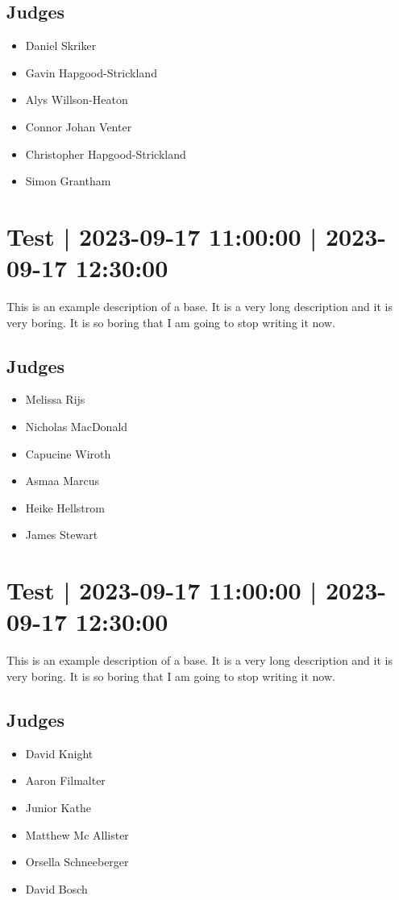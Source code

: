 \documentclass[10pt]{article}
\begin{document}
	\subsection*{Judges}
	\begin{itemize}

			\item Daniel Skriker
			\item Gavin Hapgood-Strickland
			\item Alys Willson-Heaton
			\item Connor Johan Venter
			\item Christopher Hapgood-Strickland
			\item Simon Grantham
		\end{itemize}

			\setcounter{section}{42}
	\section{Test | 2023-09-17 11:00:00 | 2023-09-17 12:30:00}
	This is an example description of a base. It is a very long description and it is very boring. It is so boring that I am going to stop writing it now.

	\subsection*{Judges}
	\begin{itemize}

			\item Melissa Rijs
			\item Nicholas MacDonald
			\item Capucine Wiroth
			\item Asmaa Marcus
			\item Heike Hellstrom
			\item James Stewart
		\end{itemize}

			\setcounter{section}{43}
	\section{Test | 2023-09-17 11:00:00 | 2023-09-17 12:30:00}
	This is an example description of a base. It is a very long description and it is very boring. It is so boring that I am going to stop writing it now.

	\subsection*{Judges}
	\begin{itemize}

			\item David Knight
			\item Aaron Filmalter
			\item Junior Kathe
			\item Matthew Mc Allister
			\item Orsella Schneeberger
			\item David Bosch
		\end{itemize}
\end{document}
